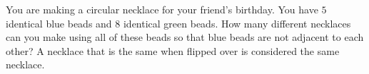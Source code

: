 You are making a circular necklace for your friend's birthday. You have $5$ identical blue beads and 8 identical green beads. How many different necklaces can you make using all of these beads so that blue beads are not adjacent to each other? A necklace that is the same when flipped over is considered the same necklace.
